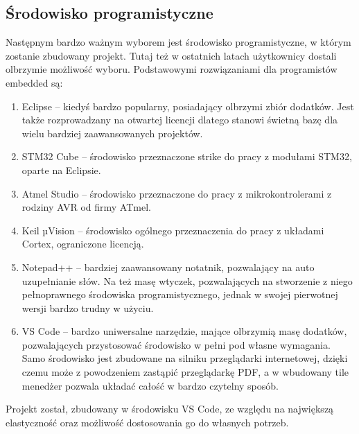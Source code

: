     \subsection{Środowisko programistyczne}
        Następnym bardzo ważnym wyborem jest środowisko programistyczne, w którym zostanie zbudowany projekt.
        Tutaj też w ostatnich latach użytkownicy dostali olbrzymie możliwość wyboru.
        Podstawowymi rozwiązaniami dla programistów embedded są:
        \begin{enumerate}
            \item Eclipse -- kiedyś bardzo popularny, posiadający olbrzymi zbiór dodatków.
            Jest także rozprowadzany na otwartej licencji dlatego stanowi świetną bazę dla wielu bardziej zaawansowanych projektów.
            \item STM32 Cube -- środowisko przeznaczone strike do pracy z modułami STM32, oparte na Eclipsie.
            \item Atmel Studio -- środowisko przeznaczone do pracy z mikrokontrolerami z rodziny AVR od firmy ATmel.
            \item Keil µVision -- środowisko ogólnego przeznaczenia do pracy z układami Cortex, ograniczone licencją.
            \item Notepad++ -- bardziej zaawansowany notatnik, pozwalający na auto uzupełnianie słów. Na też masę wtyczek, pozwalających na stworzenie z niego pełnoprawnego środowiska programistycznego, jednak w swojej pierwotnej wersji bardzo trudny w użyciu.
            \item VS Code -- bardzo uniwersalne narzędzie, mające olbrzymią masę dodatków, pozwalających przystosować środowisko w pełni pod własne wymagania.
            Samo środowisko jest zbudowane na silniku przeglądarki internetowej, dzięki czemu może z powodzeniem zastąpić przeglądarkę PDF, a w wbudowany tile menedżer pozwala układać całość w bardzo czytelny sposób.
        \end{enumerate}
        Projekt został, zbudowany w środowisku VS Code, ze względu na największą elastyczność oraz możliwość dostosowania go do własnych potrzeb.


